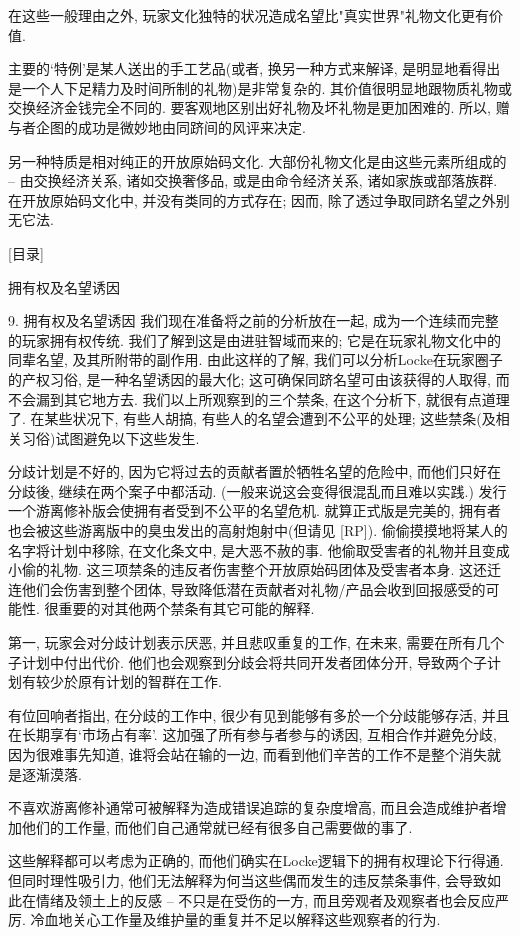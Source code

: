 \documentclass[a4paper,12pt,UTF8,twoside]{ctexbook}
\begin{document}
在这些一般理由之外, 玩家文化独特的状况造成名望比"真实世界"礼物文化更有价值.

主要的`特例'是某人送出的手工艺品(或者, 换另一种方式来解译, 是明显地看得出是一个人下足精力及时间所制的礼物)是非常复杂的. 其价值很明显地跟物质礼物或交换经济金钱完全不同的. 要客观地区别出好礼物及坏礼物是更加困难的. 所以, 赠与者企图的成功是微妙地由同跻间的风评来决定.

另一种特质是相对纯正的开放原始码文化.  大部份礼物文化是由这些元素所组成的 -- 由交换经济关系, 诸如交换奢侈品, 或是由命令经济关系, 诸如家族或部落族群. 在开放原始码文化中, 并没有类同的方式存在; 因而, 除了透过争取同跻名望之外别无它法.

[目录]

拥有权及名望诱因

9. 拥有权及名望诱因
我们现在准备将之前的分析放在一起, 成为一个连续而完整的玩家拥有权传统. 我们了解到这是由进驻智域而来的; 它是在玩家礼物文化中的同辈名望, 及其所附带的副作用.
由此这样的了解, 我们可以分析Locke在玩家圈子的产权习俗, 是一种名望诱因的最大化; 这可确保同跻名望可由该获得的人取得, 而不会漏到其它地方去.
我们以上所观察到的三个禁条, 在这个分析下, 就很有点道理了. 在某些状况下, 有些人胡搞, 有些人的名望会遭到不公平的处理; 这些禁条(及相关习俗)试图避免以下这些发生.

分歧计划是不好的, 因为它将过去的贡献者置於牺牲名望的危险中, 而他们只好在分歧後, 继续在两个案子中都活动. (一般来说这会变得很混乱而且难以实践.)
发行一个游离修补版会使拥有者受到不公平的名望危机. 就算正式版是完美的, 拥有者也会被这些游离版中的臭虫发出的高射炮射中(但请见 [RP]).
偷偷摸摸地将某人的名字将计划中移除, 在文化条文中, 是大恶不赦的事. 他偷取受害者的礼物并且变成小偷的礼物.
这三项禁条的违反者伤害整个开放原始码团体及受害者本身. 这还迁连他们会伤害到整个团体, 导致降低潜在贡献者对礼物/产品会收到回报感受的可能性.
很重要的对其他两个禁条有其它可能的解释.

第一, 玩家会对分歧计划表示厌恶, 并且悲叹重复的工作, 在未来, 需要在所有几个子计划中付出代价.  他们也会观察到分歧会将共同开发者团体分开, 导致两个子计划有较少於原有计划的智群在工作.

有位回响者指出, 在分歧的工作中, 很少有见到能够有多於一个分歧能够存活, 并且在长期享有`市场占有率'. 这加强了所有参与者参与的诱因, 互相合作并避免分歧, 因为很难事先知道, 谁将会站在输的一边, 而看到他们辛苦的工作不是整个消失就是逐渐漠落.

不喜欢游离修补通常可被解释为造成错误追踪的复杂度增高, 而且会造成维护者增加他们的工作量, 而他们自己通常就已经有很多自己需要做的事了.

这些解释都可以考虑为正确的, 而他们确实在Locke逻辑下的拥有权理论下行得通. 但同时理性吸引力, 他们无法解释为何当这些偶而发生的违反禁条事件, 会导致如此在情绪及领土上的反感 -- 不只是在受伤的一方, 而且旁观者及观察者也会反应严厉. 冷血地关心工作量及维护量的重复并不足以解释这些观察者的行为.
\end{document}

